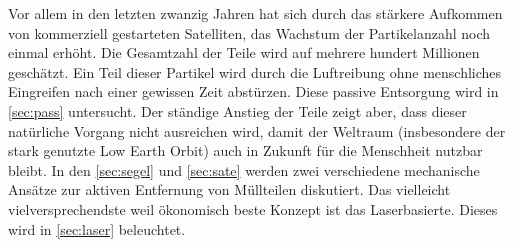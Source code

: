 \documentclass{article}
\begin{document}
Vor allem in den letzten zwanzig Jahren hat sich durch das stärkere Aufkommen von kommerziell gestarteten Satelliten, das Wachstum der Partikelanzahl noch einmal erhöht. Die Gesamtzahl der Teile wird auf mehrere hundert Millionen geschätzt. Ein Teil dieser Partikel wird durch die Luftreibung ohne menschliches Eingreifen nach einer gewissen Zeit abstürzen. Diese passive Entsorgung wird in \autoref{sec:pass} untersucht. Der ständige Anstieg der Teile zeigt aber, dass dieser natürliche Vorgang nicht ausreichen wird, damit der Weltraum (insbesondere der stark genutzte Low Earth Orbit) auch in Zukunft für die Menschheit nutzbar bleibt. In den \autoref{sec:segel} und \ref{sec:sate} werden zwei verschiedene mechanische Ansätze zur aktiven Entfernung von Müllteilen diskutiert. Das vielleicht vielversprechendste weil ökonomisch beste Konzept ist das Laserbasierte. Dieses wird in \autoref{sec:laser} beleuchtet.	
\end{document}
